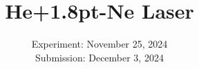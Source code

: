 

\usepackage{xspace}
\usepackage{makecell}
\newcommand{\HeNe}{He\texorpdfstring{\kern+1.2pt}{}-Ne\xspace}

\publishers{TU Dortmund – Department of Physics}

\subject{\texorpdfstring{\vspace{2ex}}{}V61\texorpdfstring{\vspace{-2ex}}{}} %
\title{He\texorpdfstring{\kern+1.8pt}{}-Ne Laser} %
\date{
	Experiment: November 25, 2024 %
	\\ Submission: December 3, 2024 %
}




\maketitle
\thispagestyle{empty}

\tableofcontents
\newpage








\printbibliography{}

%


